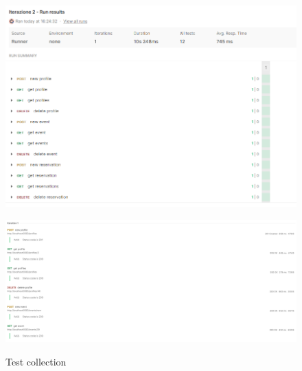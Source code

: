 \begin{figure}[h!]
\begin{center}
  \includegraphics[width=14cm]{test/postman/collections.PNG}\\
  \caption{Test collection}
  \includegraphics[width=30cm]{test/postman/collections sng.PNG}\\
\end{center}
\end{figure}